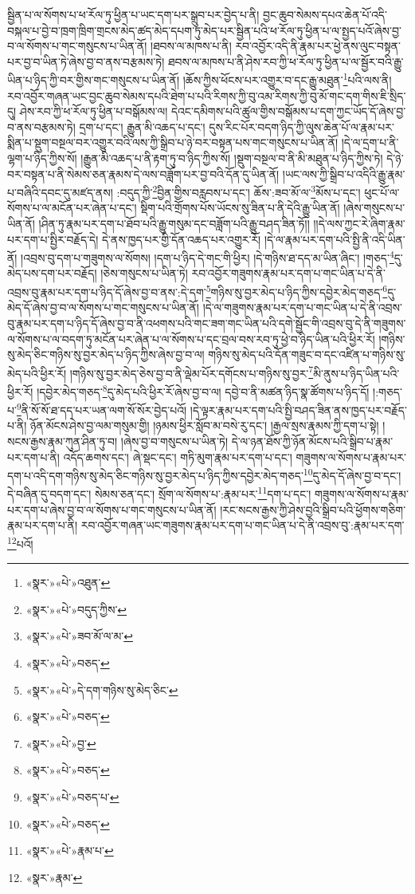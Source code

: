 སྦྱིན་པ་ལ་སོགས་པ་ཕ་རོལ་ཏུ་ཕྱིན་པ་ཡང་དག་པར་སྒྲུབ་པར་བྱེད་པ་ནི། བྱང་ཆུབ་སེམས་དཔའ་ཆེན་པོ་འདི་བསྐལ་པ་བྱེ་བ་ཁྲག་ཁྲིག་གྲངས་མེད་ཚད་མེད་དཔག་ཏུ་མེད་པར་སྦྱིན་པའི་ཕ་རོལ་ཏུ་ཕྱིན་པ་ལ་སྤྱད་པའོ་ཞེས་བྱ་བ་ལ་སོགས་པ་གང་གསུངས་པ་ཡིན་ནོ། །ཐབས་ལ་མཁས་པ་ནི། རབ་འབྱོར་འདི་ནི་རྣམ་པར་ཕྱེ་ནས་ལུང་བསྟན་པར་བྱ་བ་ཡིན་ཏེ་ཞེས་བྱ་བ་ནས་བརྩམས་ཏེ། ཐབས་ལ་མཁས་པ་ནི་ཤེས་རབ་ཀྱི་ཕ་རོལ་ཏུ་ཕྱིན་པ་ལ་སྦྱོར་བའི་རྒྱུ་ཡིན་པ་ཉིད་ཀྱི་བར་གྱིས་གང་གསུངས་པ་ཡིན་ནོ། །ཆོས་ཀྱིས་ཕོངས་པར་འགྱུར་བ་དང་རྒྱུ་མཐུན་\footnote{«སྣར་»«པེ་»འཐུན་}པའི་ལས་ནི། རབ་འབྱོར་གཞན་ཡང་བྱང་ཆུབ་སེམས་དཔའི་ཐེག་པ་པའི་རིགས་ཀྱི་བུ་འམ་རིགས་ཀྱི་བུ་མོ་གང་དག་གིས་ཇི་སྲིད་དུ། ཤེས་རབ་ཀྱི་ཕ་རོལ་ཏུ་ཕྱིན་པ་བསྒོམས་ལ། དེའང་དམིགས་པའི་ཚུལ་གྱིས་བསྒོམས་པ་དག་ཀྱང་ཡོད་དོ་ཞེས་བྱ་བ་ནས་བརྩམས་ཏེ། དྲག་པ་དང་། རྒྱུན་མི་འཆད་པ་དང་། དུས་རིང་པོར་བདག་ཉིད་ཀྱི་ལུས་ཆེན་པོ་ལ་རྣམ་པར་སྨིན་པ་སྡུག་བསྔལ་བར་འགྱུར་བའི་ལས་ཀྱི་སྒྲིབ་པ་ཉེ་བར་བསྟན་པས་གང་གསུངས་པ་ཡིན་ནོ། །དེ་ལ་དྲག་པ་ནི་ལྷག་པ་ཉིད་ཀྱིས་སོ། །རྒྱུན་མི་འཆད་པ་ནི་རྟག་ཏུ་བ་ཉིད་ཀྱིས་སོ། །སྡུག་བསྔལ་བ་ནི་མི་མཐུན་པ་ཉིད་ཀྱིས་ཏེ། དེ་ཉེ་བར་བསྟན་པ་ནི་སེམས་ཅན་རྣམས་དེ་ལས་བཟློག་པར་བྱ་བའི་དོན་དུ་ཡིན་ནོ། །ཡང་ལས་ཀྱི་སྒྲིབ་པ་འདིའི་རྒྱུ་རྣམ་པ་བཞིའི་དབང་དུ་མཛད་ནས། :བདུད་ཀྱི་\footnote{«སྣར་»«པེ་»བདུད་ཀྱིས་}བྱིན་གྱིས་བརླབས་པ་དང་། ཆོས་:ཟབ་མོ་ལ་\footnote{«སྣར་»«པེ་»ཟབ་མོ་ལ་མ་}མོས་པ་དང་། ཕུང་པོ་ལ་སོགས་པ་ལ་མངོན་པར་ཞེན་པ་དང་། སྡིག་པའི་གྲོགས་པོས་ཡོངས་སུ་ཟིན་པ་ནི་དེའི་རྒྱུ་ཡིན་ནོ། །ཞེས་གསུངས་པ་ཡིན་ནོ། །ཤིན་ཏུ་རྣམ་པར་དག་པ་ཐོབ་པའི་རྒྱུ་གསུམ་དང་བཟློག་པའི་རྒྱུ་བཤད་ཟིན་ཏོ།། །།དེ་ལས་ཀྱང་རེ་ཞིག་རྣམ་པར་དག་པ་སྤྱིར་བརྗོད་དེ། དེ་ནས་ཁྱད་པར་གྱི་དོན་འཆད་པར་འགྱུར་རོ། །དེ་ལ་རྣམ་པར་དག་པའི་སྤྱི་ནི་འདི་ཡིན་ནོ། །འབྲས་བུ་དག་པ་གཟུགས་ལ་སོགས། །དག་པ་ཉིད་དེ་གང་གི་ཕྱིར། །དེ་གཉིས་ཐ་དད་མ་ཡིན་ཞིང་། །གཅད་\footnote{«སྣར་»«པེ་»བཅད་}དུ་མེད་པས་དག་པར་བརྗོད། །ཅེས་གསུངས་པ་ཡིན་ཏེ། རབ་འབྱོར་གཟུགས་རྣམ་པར་དག་པ་གང་ཡིན་པ་དེ་ནི་འབྲས་བུ་རྣམ་པར་དག་པ་ཉིད་དོ་ཞེས་བྱ་བ་ནས་:དེ་དག་\footnote{«སྣར་»«པེ་»དེ་དག་གཉིས་སུ་མེད་ཅིང་}གཉིས་སུ་བྱར་མེད་པ་ཉིད་ཀྱིས་དབྱེར་མེད་གཅད་\footnote{«སྣར་»«པེ་»བཅད་}དུ་མེད་དོ་ཞེས་བྱ་བ་ལ་སོགས་པ་གང་གསུངས་པ་ཡིན་ནོ། །དེ་ལ་གཟུགས་རྣམ་པར་དག་པ་གང་ཡིན་པ་དེ་ནི་འབྲས་བུ་རྣམ་པར་དག་པ་ཉིད་དོ་ཞེས་བྱ་བ་ནི་འཕགས་པའི་གང་ཟག་གང་ཡིན་པའི་དགེ་སྦྱོང་གི་འབྲས་བུ་དེ་ནི་གཟུགས་ལ་སོགས་པ་ལ་བདག་ཏུ་མངོན་པར་ཞེན་པ་ལ་སོགས་པ་དང་བྲལ་བས་རབ་ཏུ་ཕྱེ་བ་ཉིད་ཡིན་པའི་ཕྱིར་རོ། །གཉིས་སུ་མེད་ཅིང་གཉིས་སུ་བྱར་མེད་པ་ཉིད་ཀྱིས་ཞེས་བྱ་བ་ལ། གཉིས་སུ་མེད་པའི་དོན་གཟུང་བ་དང་འཛིན་པ་གཉིས་སུ་མེད་པའི་ཕྱིར་རོ། །གཉིས་སུ་བྱར་མེད་ཅེས་བྱ་བ་ནི་ལྡེམ་པོར་དགོངས་པ་གཉིས་སུ་བྱར་\footnote{«སྣར་»«པེ་»བྱ་}མི་ནུས་པ་ཉིད་ཡིན་པའི་ཕྱིར་རོ། །དབྱེར་མེད་གཅད་\footnote{«སྣར་»«པེ་»བཅད་}དུ་མེད་པའི་ཕྱིར་རོ་ཞེས་བྱ་བ་ལ། དབྱེ་བ་ནི་མཚན་ཉིད་སྣ་ཚོགས་པ་ཉིད་དོ། །:གཅད་པ་\footnote{«སྣར་»«པེ་»བཅད་པ་}ནི་སོ་སོ་ཐ་དད་པར་ཡན་ལག་སོ་སོར་བྱེད་པའོ། །དེ་ལྟར་རྣམ་པར་དག་པའི་སྤྱི་བཤད་ཟིན་ནས་ཁྱད་པར་བརྗོད་པ་ནི། ཉོན་མོངས་ཤེས་བྱ་ལམ་གསུམ་གྱི། །ཉམས་ཕྱིར་སློབ་མ་བསེ་རུ་དང་། །རྒྱལ་སྲས་རྣམས་ཀྱི་དག་པ་སྟེ། །སངས་རྒྱས་རྣམ་ཀུན་ཤིན་ཏུ་བ། །ཞེས་བྱ་བ་གསུངས་པ་ཡིན་ཏེ། དེ་ལ་ཉན་ཐོས་ཀྱི་ཉོན་མོངས་པའི་སྒྲིབ་པ་རྣམ་པར་དག་པ་ནི། འདོད་ཆགས་དང་། ཞེ་སྡང་དང་། གཏི་མུག་རྣམ་པར་དག་པ་དང་། གཟུགས་ལ་སོགས་པ་རྣམ་པར་དག་པ་འདི་དག་གཉིས་སུ་མེད་ཅིང་གཉིས་སུ་བྱར་མེད་པ་ཉིད་ཀྱིས་དབྱེར་མེད་གཅད་\footnote{«སྣར་»«པེ་»བཅད་}དུ་མེད་དོ་ཞེས་བྱ་བ་དང་། དེ་བཞིན་དུ་བདག་དང་། སེམས་ཅན་དང་། སྲོག་ལ་སོགས་པ་:རྣམ་པར་\footnote{«སྣར་»«པེ་»རྣམ་པ་}དག་པ་དང་། གཟུགས་ལ་སོགས་པ་རྣམ་པར་དག་པ་ཞེས་བྱ་བ་ལ་སོགས་པ་གང་གསུངས་པ་ཡིན་ནོ། །རང་སངས་རྒྱས་ཀྱི་ཤེས་བྱའི་སྒྲིབ་པའི་ཕྱོགས་གཅིག་རྣམ་པར་དག་པ་ནི། རབ་འབྱོར་གཞན་ཡང་གཟུགས་རྣམ་པར་དག་པ་གང་ཡིན་པ་དེ་ནི་འབྲས་བུ་:རྣམ་པར་དག་\footnote{«སྣར་»རྣམ་}པའོ། 